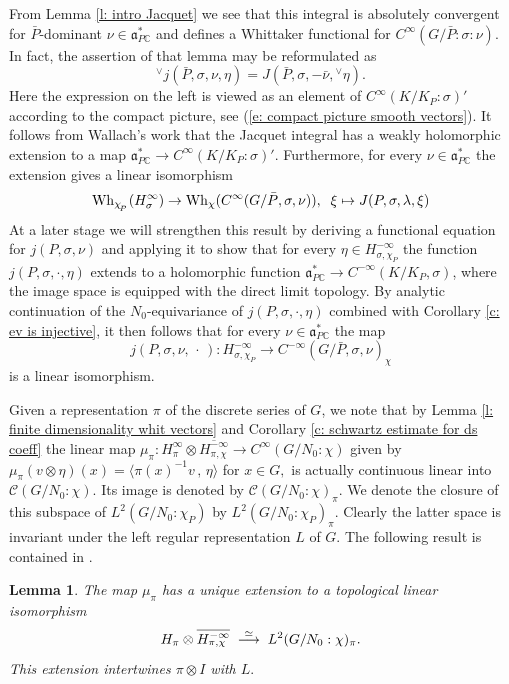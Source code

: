 \documentclass[12pt,a4paper]{article}
\newtheorem{Lemma}[Thm]{Lemma}
\newenvironment{lemma}[0]{\begin{Lemma}\noindent}%
{\end{Lemma}}
\def\msy#1{{\mathbb #1}}
\def\C{{\msy C}}
\def\gl{\lambda}
\def\gs{\sigma}
\def\got#1{\mathfrak #1}
\def\fa{{\got a}}
\def\to{\rightarrow}
\def\inp#1#2{\langle#1\,,\,#2\rangle}
\def\iC{{\scriptscriptstyle \C}}
\def\cC{{\mathcal C}}
\numberwithin{Thm}{section}
\numberwithin{equation}{section}
\def\dotvar{\, \cdot\,}
\def\Wh{{\rm Wh}}
\def\faPdc{{\fa_{P\iC}^*}}
\numberwithin{equation}{section}
\def\faPdc{\fa_{P\iC}^*}
\def\cchiP{\cchi_{{\!}_P} }
\def\cchi{\chi}
\def\gsP{\gs}%
\def\veec{\vee}%
\def\trw{{}^{\scriptscriptstyle\veec}}
\begin{document}
From Lemma \ref{l: intro Jacquet} we see that 
this integral is absolutely convergent for $\bar P$-dominant $\nu \in \faPdc$ 
and defines a Whittaker functional for $C^\infty(G/\bar P: \gs :\nu).$ 
In fact, the assertion of that lemma may be reformulated as 
\begin{equation}
\label{e: comparison j and J}
\trw\! j(\bar P, \gs, \nu, \eta) = J(\bar P,\gs, -\bar\nu, \trw\!\eta).
\end{equation} 
Here the expression on the left is viewed as an element
of $C^{\infty}(K/K_P:\gs)'$ according to the compact picture, see 
(\ref{e: compact picture smooth vectors}).
%
It follows from Wallach's work \cite[Thm~15.4.1]{Wrrg2} that the Jacquet 
integral has a weakly holomorphic extension to a map
$\faPdc \to C^\infty(K/K_P:\gs)'.$ Furthermore, for every $\nu \in \faPdc$ 
the extension gives a linear isomorphism
$$ 
 \Wh_{\cchiP}(H_\gs^\infty) \to \Wh_\cchi(C^\infty(G/\bar P, \gs, \nu)), \;\; \xi \mapsto J(P, \gs, \gl, \xi)
$$%
At a later stage we will strengthen this result by deriving a functional equation
for $j(P,\gs,\nu)$ and applying it to show that for every $\eta \in H_{\gs, \cchi_P}^{-\infty}$ the function $j(P,\gs, \cdot, \eta)$ extends to a  holomorphic 
function $\faPdc \to C^{-\infty}(K/K_P,\gsP)$, where the image space is equipped
with the direct limit topology. By analytic continuation of the $N_0$-equivariance of 
$j(P,\gs, \cdot, \eta)$ combined with 
Corollary \ref{c: ev is injective}, 
%
it then follows that for every $\nu \in \faPdc$ 
the map 
$$
j(P, \gs, \nu, \dotvar): H_{\gs,\cchi_P}^{-\infty} \to C^{- \infty}(G/\bar P, \gs, \nu)_\cchi
$$%
is a linear isomorphism.

Given a representation $\pi$ of the discrete series of $G$, we note that by 
Lemma \ref{l: finite dimensionality whit vectors} and Corollary \ref{c: schwartz estimate for ds coeff} the linear map $\mu_\pi: H_\pi^\infty \otimes \overline{H_{\pi, \chi}^{-\infty}} \to C^\infty(G/N_0: \chi)$ given by $\mu_\pi(v\otimes \eta)(x) = \inp{\pi(x)^{-1} v}{\eta}$ for $x \in G,$ 
is actually continuous linear into $\cC(G/N_0: \chi).$ Its image is denoted by 
$ 
\cC(G/N_0: \chi)_\pi.
$ 
We denote the closure of this subspace of $L^2(G/N_0:\chi_P)$ by 
$L^2(G/N_0: \chi_P)_\pi.$ Clearly the latter space is invariant under the left regular representation
$L$ of $G.$ The following result is contained in \cite[Thm.~15.3.4]{Wrrg2}.

\begin{lemma}
\label{l: extension mu pi}
The map $\mu_\pi$ has a unique extension to a topological linear isomorphism 
\begin{equation}
\label{e: extension mu pi} 
H_\pi \otimes \overline{H_{\pi, \chi}^{-\infty}} \;\;{ \buildrel \simeq \over \longrightarrow}\;\;L^2(G/N_0: \chi)_\pi.
\end{equation} 
This extension intertwines $\pi \otimes I$ with $L.$ 
\end{lemma}
\end{document}
